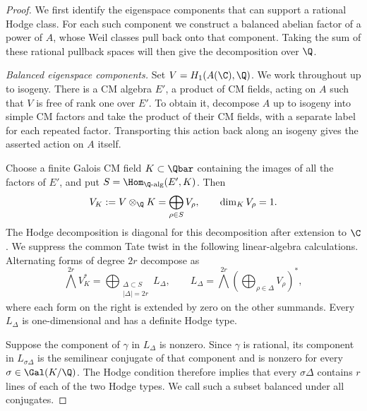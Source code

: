 \begin{proof}
We first identify the eigenspace components that can support a rational
Hodge class.  For each such component we construct a balanced abelian
factor of a power of $A$, whose Weil classes pull back onto that
component.  Taking the sum of these rational pullback spaces will then
give the decomposition over $\Q$.

\medskip\noindent
\emph{Balanced eigenspace components.}
Set $V=H_1(A(\C),\Q)$.  We work throughout up to isogeny.  There is a
CM algebra $E'$, a product of CM fields, acting on $A$ such that $V$ is
free of rank one over $E'$.  To obtain it, decompose $A$ up to isogeny
into simple CM factors and take the product of their CM fields, with a
separate label for each repeated factor.  Transporting this action back
along an isogeny gives the asserted action on $A$ itself.

Choose a finite Galois CM field $K\subset\Qbar$ containing the images of
all the factors of $E'$, and put $S=\Hom_{\Q\text{-alg}}(E',K)$.  Then
\[
                V_K:=V\otimes_{\Q}K=\bigoplus_{\rho\in S}V_\rho,
                \qquad \dim_K V_\rho=1.
\]
The Hodge decomposition is diagonal for this decomposition after
extension to $\C$.  We suppress the common Tate twist in the following
linear-algebra calculations.  Alternating forms of degree $2r$ decompose
as
\[
 \bigwedge^{2r}V_K^*
     =\bigoplus_{\substack{\Delta\subset S\\ |\Delta|=2r}}L_\Delta,
 \qquad
 L_\Delta=
 \bigwedge^{2r}\left(\bigoplus_{\rho\in\Delta}V_\rho\right)^*,
\]
where each form on the right is extended by zero on the other summands.
Every $L_\Delta$ is one-dimensional and has a definite Hodge type.

Suppose the component of $\gamma$ in $L_\Delta$ is nonzero.  Since
$\gamma$ is rational, its component in $L_{\sigma\Delta}$ is the
semilinear conjugate of that component and is nonzero for every
$\sigma\in\Gal(K/\Q)$.  The Hodge condition therefore implies that
every $\sigma\Delta$ contains $r$ lines of each of the two Hodge types.
We call such a subset balanced under all conjugates.


\end{proof}
